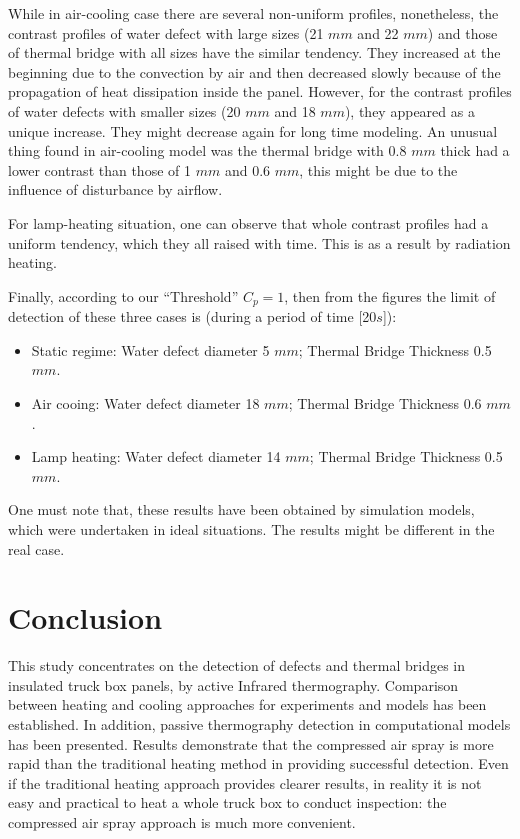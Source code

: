 \documentclass{tQRT2e}
\begin{document}
While in air-cooling case there are several non-uniform profiles, nonetheless, the contrast profiles of water defect with large sizes (21 $mm $ and 22 $ mm $) and those of thermal bridge with all sizes have the similar tendency. They increased at the beginning due to the convection by air and then decreased slowly because of the propagation of heat dissipation inside the panel. However, for the contrast profiles of water defects with smaller sizes (20 $ mm $ and 18 $ mm $), they appeared as a unique increase. They might decrease again for long time modeling. An unusual thing found in air-cooling model was the thermal bridge with 0.8 $ mm $ thick had a lower contrast than those of 1 $mm $ and 0.6 $ mm $, this might be due to the influence of disturbance by airflow. 

For lamp-heating situation, one can observe that whole contrast profiles had a uniform tendency, which they all raised with time. This is as a result by radiation heating.

Finally, according to our “Threshold” $ C_p  = 1$, then from the figures the limit of detection of these three cases is (during a period of time [20$ s $]): 
\begin{itemize}
	\item Static regime: Water defect diameter 5 $ mm $; Thermal Bridge Thickness 0.5 $ mm $.
	\item Air cooing: Water defect diameter 18 $ mm $; Thermal Bridge Thickness 0.6 $ mm $.
	\item Lamp heating: Water defect diameter 14 $ mm $; Thermal Bridge Thickness 0.5 $ mm $.
\end{itemize}
One must note that, these results have been obtained by simulation models, which were undertaken in ideal situations. The results might be different in the real case.


\section{Conclusion}
This study concentrates on the detection of defects and thermal bridges in insulated truck box panels, by active Infrared thermography. Comparison between heating and cooling approaches for experiments and models has been established. In addition, passive thermography detection in computational models has been presented. Results demonstrate that the compressed air spray is more rapid than the traditional heating method in providing successful detection. Even if the traditional heating approach provides clearer results, in reality it is not easy and practical to heat a whole truck box to conduct inspection: the compressed air spray approach is much more convenient. 
\end{document}
